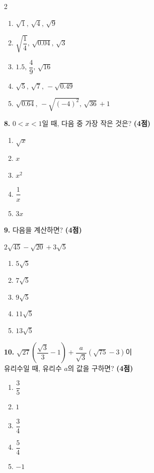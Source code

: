 \documentclass[a4paper,11pt]{article}
\newcommand{\choicenum}[1]{\textcircled{\small #1}}
\newcommand{\scorebox}[1]{\textbf{(#1점)}}
\newcommand{\qbox}[1]{%
  \begin{mdframed}[linewidth=0.8pt,innerleftmargin=6pt,innerrightmargin=6pt,innertopmargin=4pt,innerbottommargin=4pt]
  #1
  \end{mdframed}
}
\begin{document}
\begin{multicols}{2}
\begin{enumerate}[label=\protect\choicenum{\arabic*},leftmargin=*,itemsep=0pt]
  \item $\sqrt{1},\,\sqrt{4},\,\sqrt{9}$
  \item $\sqrt{\dfrac{1}{4}},\,\sqrt{0.04},\,\sqrt{3}$
  \item $1.5,\,\dfrac{4}{9},\,\sqrt{16}$
  \item $\sqrt{5},\,\sqrt{7},\,-\sqrt{0.49}$
  \item $\sqrt{0.64},\,-\sqrt{(-4)^{2}},\,\sqrt{36}+1$
\end{enumerate}

\vspace{3mm}

\noindent\textbf{8.} $0<x<1$일 때, 다음 중 가장 작은 것은? \scorebox{4}

\begin{enumerate}[label=\protect\choicenum{\arabic*},leftmargin=*,itemsep=0pt]
  \item $\sqrt{x}$
  \item $x$
  \item $x^{2}$
  \item $\dfrac{1}{x}$
  \item $3x$
\end{enumerate}

\vspace{3mm}

\noindent\textbf{9.} 다음을 계산하면? \scorebox{4}

\qbox{$2\sqrt{45}-\sqrt{20}+3\sqrt{5}$}

\begin{enumerate}[label=\protect\choicenum{\arabic*},leftmargin=*,itemsep=0pt]
  \item $5\sqrt{5}$
  \item $7\sqrt{5}$
  \item $9\sqrt{5}$
  \item $11\sqrt{5}$
  \item $13\sqrt{5}$
\end{enumerate}

\vspace{3mm}

\noindent\textbf{10.} $\sqrt{27}\!\left(\dfrac{\sqrt{3}}{3}-1\right)+\dfrac{a}{\sqrt{3}}\!\left(\sqrt{75}-3\right)$이\\
유리수일 때, 유리수 $a$의 값을 구하면? \scorebox{4}

\begin{enumerate}[label=\protect\choicenum{\arabic*},leftmargin=*,itemsep=0pt]
  \item $\dfrac{3}{5}$
  \item $1$
  \item $\dfrac{3}{4}$
  \item $\dfrac{5}{4}$
  \item $-1$
\end{enumerate}


\end{multicols}
\end{document}
